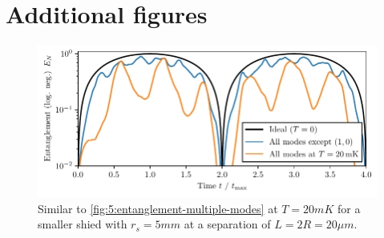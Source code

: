 \chapter{Additional figures}\label{apx:additiona-figures}
\begin{figure}[!htbp]
  \centering
  \includegraphics[width=\textwidth]{./../figures/vibrations/entanglement-multiple-modes_rs-5mm.pdf}
  \caption{Similar to \cref{fig:5:entanglement-multiple-modes} at $T=20\si{mK}$ for a smaller shied with $r_s = 5\si{mm}$ at a separation of $L=2R = 20\si{\mu m}$.}
  \label{fig:apx:entanglement-thermal-shield-rs-5mm}
\end{figure}